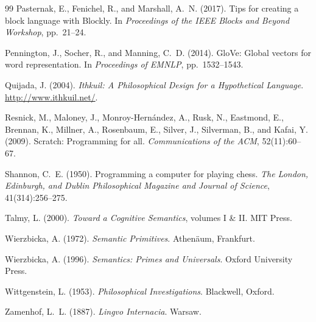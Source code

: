 \documentclass[11pt,a4paper]{article}
\begin{document}
\begin{thebibliography}{99}
Pasternak, E., Fenichel, R., and Marshall, A.~N. (2017).
\newblock Tips for creating a block language with Blockly.
\newblock In \emph{Proceedings of the IEEE Blocks and Beyond Workshop}, pp.~21--24.

Pennington, J., Socher, R., and Manning, C.~D. (2014).
\newblock GloVe: Global vectors for word representation.
\newblock In \emph{Proceedings of EMNLP}, pp.~1532--1543.

Quijada, J. (2004).
\newblock \emph{Ithkuil: A Philosophical Design for a Hypothetical Language}.
\newblock \url{http://www.ithkuil.net/}.

Resnick, M., Maloney, J., Monroy-Hern\'andez, A., Rusk, N., Eastmond, E., Brennan, K., Millner, A., Rosenbaum, E., Silver, J., Silverman, B., and Kafai, Y. (2009).
\newblock Scratch: Programming for all.
\newblock \emph{Communications of the ACM}, 52(11):60--67.

Shannon, C.~E. (1950).
\newblock Programming a computer for playing chess.
\newblock \emph{The London, Edinburgh, and Dublin Philosophical Magazine and Journal of Science}, 41(314):256--275.

Talmy, L. (2000).
\newblock \emph{Toward a Cognitive Semantics}, volumes I \& II.
\newblock MIT Press.

Wierzbicka, A. (1972).
\newblock \emph{Semantic Primitives}.
\newblock Athen{\"a}um, Frankfurt.

Wierzbicka, A. (1996).
\newblock \emph{Semantics: Primes and Universals}.
\newblock Oxford University Press.

Wittgenstein, L. (1953).
\newblock \emph{Philosophical Investigations}.
\newblock Blackwell, Oxford.

Zamenhof, L.~L. (1887).
\newblock \emph{Lingvo Internacia}.
\newblock Warsaw.

\end{thebibliography}
\end{document}
